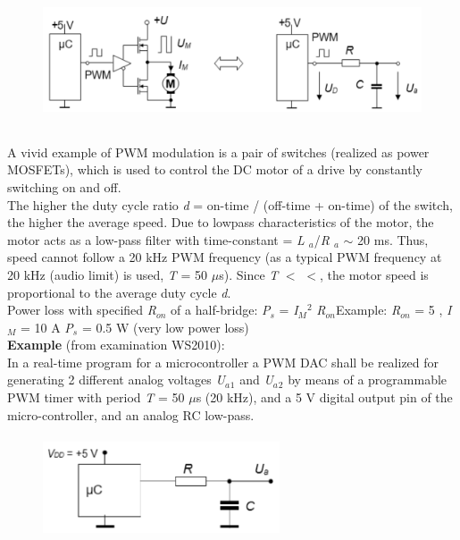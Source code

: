    \begin{figure}[h]
    \centering
    \includegraphics[width=14cm, height=4cm]{Images/image171.png}
    \label{fig:Fig 125}
    \end{figure}
    
\os{\newpage}

A vivid example of PWM modulation is a pair of switches (realized as power MOSFETs), which is used to control the DC motor of a drive by constantly switching on and off.\\

The higher the duty cycle ratio \textit{d} = on-time / (off-time + on-time) of the switch, the higher the average speed. Due to lowpass characteristics of the motor, the motor acts as a low-pass filter with time-constant  = \textit{L ${}_{a}$}/\textit{R ${}_{a}$} $\mathrm{\sim}$ 20 ms. Thus, speed cannot follow a 20 kHz PWM frequency (as a typical PWM frequency at 20 kHz (audio limit) is used,  \textit{T} = 50 $\mu$s). Since \textit{T} $\mathrm{<}$ $\mathrm{<}$, the motor speed is proportional to the average duty cycle \textit{d}. \\

Power loss with specified \textit{R${}_{on}$} of a half-bridge:     \textit{P${}_{s}$ }= \textit{I${}_{M}$}${}^{2}$ \textit{R${}_{on}$}Example: \textit{R${}_{on}$} = 5 , \textit{I${}_{M}$} = 10 A  \textit{P${}_{s}$} = 0.5 W    (very low power loss)\\

\textbf{Example} (from examination WS2010):\\

In a real-time program for a microcontroller a PWM DAC shall be realized for generating 2 different analog voltages \textit{U${}_{a}$}${}_{1}$ and \textit{U${}_{a}$}${}_{2}$ by means of a programmable PWM timer with period \textit{T} = 50 $\mu$s (20 kHz), and a 5 V digital output pin of the micro-controller, and an analog RC low-pass.

    \begin{figure}[h]
    \centering
    \includegraphics[width=7cm, height=3cm]{Images/image172.png}
    \label{fig:Fig 126}
    \end{figure}

